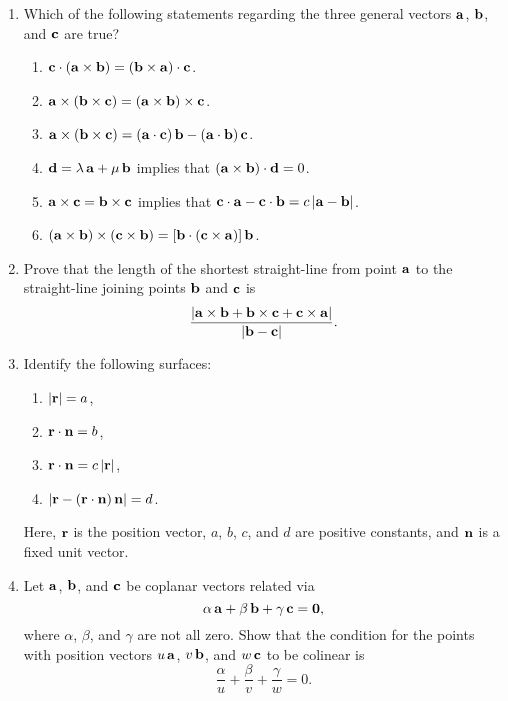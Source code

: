 {\begin{enumerate}
\item Which of the following statements regarding the three general vectors ${\bf a}$, ${\bf b}$, and ${\bf c}$ are true?
\begin{enumerate}
\item ${\bf c}\cdot ({\bf a}\times {\bf b}) = ({\bf b}\times {\bf a})\cdot{\bf c}$.
\item ${\bf a}\times ({\bf b}\times {\bf c})= ({\bf a}\times {\bf b})\times {\bf c}$.
\item ${\bf a}\times ({\bf b}\times {\bf c}) = ({\bf a}\cdot{\bf c})\,{\bf b} - ({\bf a}\cdot{\bf b})\,{\bf c}$.
\item ${\bf d} = \lambda\,{\bf a} + \mu\,{\bf b}$ implies that $({\bf a}\times {\bf b})\cdot {\bf d} = 0$. 
\item ${\bf a}\times {\bf c} = {\bf b}\times {\bf c}$ implies that ${\bf c}\cdot{\bf a} - {\bf c}\cdot{\bf b} = c\,|{\bf a}-{\bf b}|$.
\item $({\bf a}\times {\bf b})\times ({\bf c}\times {\bf b}) = [{\bf b}\cdot({\bf c}\times {\bf a})]\,{\bf b}$.
\end{enumerate}

\item Prove that the length of the shortest straight-line from point ${\bf a}$ to the
straight-line joining points ${\bf b}$ and ${\bf c}$ is
$$
\frac{|{\bf a}\times {\bf b} + {\bf b}\times {\bf c} + {\bf c}\times {\bf a}|}{|{\bf b}-{\bf c}|}.
$$

\item Identify the following surfaces:
\begin{enumerate}
\item $|{\bf r}| = a$,
\item ${\bf r}\cdot{\bf n} = b$,
\item ${\bf r}\cdot{\bf n} = c\,|{\bf r}|$,
\item $|{\bf r} -({\bf r}\cdot{\bf n})\,{\bf n}| = d$.
\end{enumerate}
Here, ${\bf r}$ is the position vector, $a$, $b$,  $c$, and $d$ are positive
constants, and ${\bf n}$ is a fixed unit vector.

\item Let ${\bf a}$, ${\bf b}$, and ${\bf c}$ be coplanar vectors related via
$$
\alpha\,{\bf a} + \beta\,{\bf b} + \gamma\,{\bf c} = {\bf 0},
$$
where $\alpha$, $\beta$, and $\gamma$ are not all zero. Show that the condition
for the points with position vectors $u\,{\bf a}$, $v\,{\bf b}$,
and $w\,{\bf c}$ to be colinear is
$$
\frac{\alpha}{u} +\frac{\beta}{v} + \frac{\gamma}{w} = 0.
$$


\end{enumerate}}
